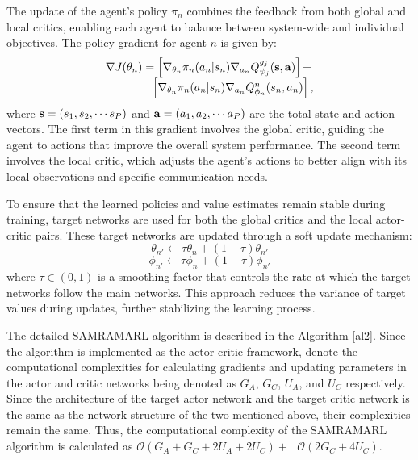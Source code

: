 \documentclass[10pt, lettersize,journal]{IEEEtran}
\begin{document}
	The update of the agent’s policy ${\pi _n}$ combines the feedback from both global and local critics, enabling each agent to balance between system-wide and individual objectives.
	The policy gradient for agent $n$ is given by:
	\begin{equation}\label{eq17}
		\begin{array}{l}
			\nabla J({\theta _n}) = \left[ {{\nabla _{{\theta _n}}}{\pi _n}({a_n}|{s_n}){\nabla _{{a_n}}}Q_{{\psi _j}}^{{g_j}}({\bf{s}},{\bf{a}})} \right] + \\
			{\rm{                }}\qquad\qquad\left[ {{\nabla _{{\theta _n}}}{\pi _n}({a_n}|{s_n}){\nabla _{{a_n}}}Q_{{\phi _n}}^n({s_n},{a_n})} \right],
		\end{array}
	\end{equation}
	where ${\bf{s}} = ({s_1},{s_2}, \cdots {s_P})$ and 
	${\bf{a}} = ({a_1},{a_2}, \cdots {a_P})$ are the total state and action vectors.
	The first term in this gradient involves the global critic, guiding the agent to actions that improve the overall system performance. The second term involves the local critic, which adjusts the agent's actions to better align with its local observations and specific communication needs.
	
	To ensure that the learned policies and value estimates remain stable during training, target networks are used for both the global critics and the local actor-critic pairs. These target networks are updated through a soft update mechanism:
	\begin{equation}\label{eq29}
		{\theta _{n'}} \leftarrow \tau {\theta _n} + (1 - \tau ){\theta _{n'}}
	\end{equation}
	\begin{equation}\label{eq30}
		{\phi _{n'}} \leftarrow \tau {\phi _n} + (1 - \tau ){\phi _{n'}}
	\end{equation}
	where $ \tau  \in (0,1)$ is a smoothing factor that controls the rate at which the target networks follow the main networks. This approach reduces the variance of target values during updates, further stabilizing the learning process.
	
	The detailed SAMRAMARL algorithm is described in the Algorithm \ref{al2}.	
	Since the algorithm is implemented as the actor-critic framework, denote the computational complexities for calculating gradients and updating parameters in the actor and critic networks being denoted as $G_A$, $G_C$, $U_A$, and $U_C$ respectively. Since the architecture of the target actor network and the target critic network is the same as the network structure of the two mentioned above, their complexities remain the same. Thus, the computational complexity of the SAMRAMARL algorithm is calculated as
	$\mathcal{O}\left( {{G_A} + {G_C} + 2{U_A} + 2{U_C}} \right) + {\text{ }}\mathcal{O}\left( {2{G_C} + 4{U_C}} \right)$.
	
\end{document}
